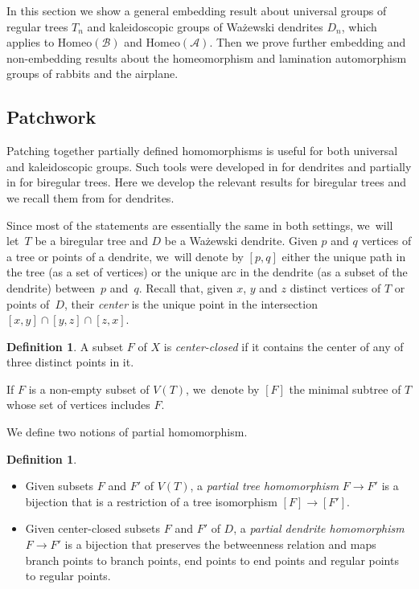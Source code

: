 \documentclass[JEP,XML,SOM,Unicode,NoFloatCountersInSection,published]{cedram}
\theoremstyle{plain}
\theoremstyle{definition}
\newtheorem{definition}[theorem]{Definition}
\theoremstyle{remark}
\newcommand{\Homeo}{\mathrm{Homeo}}
\newcommand{\A}{\mathcal{A}}
\newcommand{\B}{\mathcal{B}}
\begin{document}
In this section we show a general embedding result about universal groups of regular trees $T_n$ and kaleidoscopic groups of Ważewski dendrites $D_n$, which applies to $\Homeo(\B)$ and $\Homeo(\A)$.
Then we prove further embedding and non-embedding results about the homeomorphism and lamination automorphism groups of rabbits and the airplane.

\subsection{Patchwork}

Patching together partially defined homomorphisms is useful for both universal and kaleidoscopic groups.
Such tools were developed in \cite[\S 4]{Kaleidoscopic} for dendrites and partially in \cite[Lem.\,17]{biregular} for biregular trees.
Here we develop the relevant results for biregular trees and we recall them from \cite{Kaleidoscopic} for dendrites.

Since most of the statements are essentially the same in both settings, we~will let~$T$ be a biregular tree and $D$ be a Ważewski dendrite.
Given $p$ and $q$ vertices of a tree or points of a dendrite, we~will denote by $[p,q]$ either the unique path in the tree (as a set of vertices) or the unique arc in the dendrite (as a subset of the dendrite) between~$p$ and~$q$.
Recall that, given $x$, $y$ and $z$ distinct vertices of $T$ or points of~$D$, their \emph{center} is the unique point in the intersection $[x,y] \cap [y,z] \cap [z,x]$.

\begin{definition}
\label{def.center.closed}
A subset $F$ of $X$ is \emph{center-closed} if it contains the center of any of three distinct points in it.
\end{definition}

If $F$ is a non-empty subset of $V(T)$, we~denote by $[F]$ the minimal subtree of $T$ whose set of vertices includes $F$.

\pagebreak[2]
We define two notions of partial homomorphism.
\skpt
\begin{definition}
\label{def.partial.morphism}
\begin{itemize}
\item Given subsets $F$ and $F'$ of $V(T)$, a \emph{partial tree homomorphism} $F \to F'$ is a bijection that is a restriction of a tree isomorphism $[F] \to [F']$.
\item Given center-closed subsets $F$ and $F'$ of $D$, a \emph{partial dendrite homomorphism} $F \to F'$ is a bijection that preserves the betweenness relation and maps branch points to branch points, end points to end points and regular points to regular points.
\end{itemize}
\end{definition}
\end{document}
